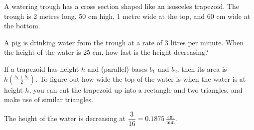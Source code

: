\begin{Mquestion}\label{s3.2trianglesfirst}
A watering trough has a cross section shaped like an isosceles trapezoid. The trough is 2 metres long, 50 cm high, 1 metre wide at the top, and 60 cm wide at the bottom.
\begin{center}\end{center}
A pig is drinking water from the trough at a rate of 3 litres per minute. When the height of the water is 25 cm, how fast is the height decreasing?
\end{Mquestion}
\begin{hint}
If a  trapezoid has height $h$ and (parallel) bases $b_1$ and $b_2$, then its area is $h\left(\frac{b_1+b_2}{2}\right)$. To figure out how wide the top of the water is when the water is at height $h$, you can cut the trapezoid up into a rectangle and two triangles, and make use of similar triangles.
\end{hint}
\begin{answer} The height of the water is decreasing at
$\dfrac{3}{16}=0.1875~\frac{\mathrm{cm}}{\mathrm{min}}$.
\end{answer}
